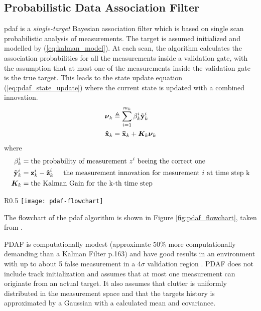 \subsection{Probabilistic Data Association Filter}
\label{pdaf}
\gls{pdaf} is a \emph{single-target} Bayesian association filter which is based on single scan probabilistic analysis of \glspl{measurement}. The \gls{target} is assumed initialized and modelled by (\ref{eq:kalman_model}). At each scan, the algorithm calculates the association probabilities for all the \glspl{measurement} inside a validation gate, with the assumption that at most one of the \glspl{measurement} inside the validation gate is the true \gls{target}. This leads to the state update equation (\ref{eq:pdaf_state_update}) where the current state is updated with a combined innovation.
\begin{equation}
\begin{split}
\boldsymbol{\mathbf{\nu}}_k &\triangleq \sum\limits_{i=1}^{m_k} \beta_k^i \boldsymbol{\mathbf{\tilde{y}}}_k^i \\
\boldsymbol{\mathbf{\hat{x}}}_{k} &= \boldsymbol{\mathbf{\bar{x}}}_{k} + \bm{K}_k \boldsymbol{\mathbf{\nu}}_k
\end{split}
\label{eq:pdaf_state_update}
\end{equation} 
where
\begin{equation*}
\begin{split}
	\beta_k^i	&= \text{the probability of measurement $z^i$ beeing the correct one} \\
	\boldsymbol{\mathbf{\tilde{y}}}_k^i &= \boldsymbol{\mathbf{z}}_k^i - \boldsymbol{\mathbf{\hat{z}}}_k^i \hspace{5mm}	\text{the measurement innovation for mesurement $i$ at time step k} \\
	\bm{K}_k 	&= \text{the Kalman Gain for the k-th time step} \\
\end{split}
\end{equation*}
\begin{wrapfigure}[20]{R}{0.5\textwidth}
\centering
\texttt{[image: pdaf-flowchart]}
\caption{\gls{pdaf} flowchart}
\label{fig:pdaf_flowchart}
\end{wrapfigure}
The flowchart of the \gls{pdaf} algorithm is shown in Figure \ref{fig:pdaf_flowchart}, taken from \cite{Bar-Shalom1998}.

PDAF is computationally modest (approximate 50\% more computationally demanding than a Kalman Filter \cite{Bar-Shalom1998} p.163) and have good results in an environment with up to about 5 false \gls{measurement} in a $4\sigma$ validation region \cite{Bar-Shalom1998}. PDAF does not include track initialization and assumes that at most one \gls{measurement} can originate from an actual \gls{target}. It also assumes that clutter is uniformly distributed in the \gls{measurement} space and that the \glspl{target} history is approximated by a Gaussian with a calculated mean and covariance.

